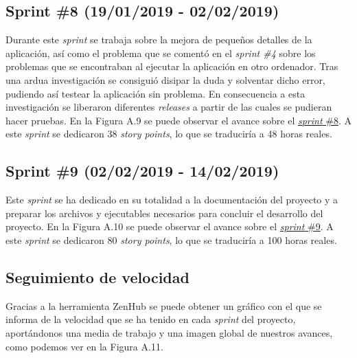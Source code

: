 
\subsection{Sprint \#8 (19/01/2019 - 02/02/2019)}

Durante este \textit{sprint} se trabaja sobre la mejora de pequeños detalles de la aplicación, así como el problema que se comentó en el \textit{sprint \#4} sobre los problemas que se encontraban al ejecutar la aplicación en otro ordenador. Tras una ardua investigación se consiguió disipar la duda y solventar dicho error, pudiendo así testear la aplicación sin problema. En consecuencia a esta investigación se liberaron diferentes \textit{releases} a partir de las cuales se pudieran hacer pruebas. En la Figura A.9 se puede observar el avance sobre el \href{https://github.com/FranBurgos/TFG/milestone/9?closed=1}{\textit{sprint} \#8}. A este \textit{sprint} se dedicaron 38 \textit{story points}, lo que se traduciría a 48 horas reales.


\subsection{Sprint \#9 (02/02/2019 - 14/02/2019)}

Este \textit{sprint} se ha dedicado en su totalidad a la documentación del proyecto y a preparar los archivos y ejecutables necesarios para concluir el desarrollo del proyecto. En la Figura A.10 se puede observar el avance sobre el \href{https://github.com/FranBurgos/TFG/milestone/10?closed=1}{\textit{sprint} \#9}. A este \textit{sprint} se dedicaron 80 \textit{story points}, lo que se traduciría a 100 horas reales.


\subsection{Seguimiento de velocidad}

Gracias a la herramienta ZenHub se puede obtener un gráfico con el que se informa de la velocidad que se ha tenido en cada \textit{sprint} del proyecto, aportándonos una media de trabajo y una imagen global de nuestros avances, como podemos ver en la Figura A.11.


